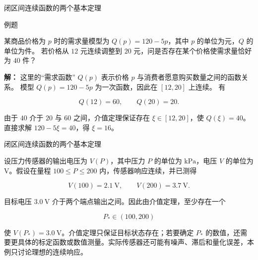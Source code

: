 \documentclass[aspectratio=169,10pt,fontset=fandol]{ctexbeamer}
\begin{document}
\begin{frame}[t,fragile]{闭区间连续函数的两个基本定理}
\normalsize
\begin{block}{例题}
{\normalsize
某商品价格为 $p$ 时的需求量模型为 $Q(p)=120-5p$，其中 $p$ 的单位为元，$Q$ 的单位为件。 若价格从 $12$ 元连续调整到 $20$ 元，问是否存在某个价格使需求量恰好为 $40$ 件？


}
\end{block}
\pause
{\normalsize
\textbf{解：}
这里的“需求函数” $Q(p)$ 表示价格 $p$ 与消费者愿意购买数量之间的函数关系。 模型 $Q(p)=120-5p$ 为一次函数，因此在 $[12,20]$ 上连续。 有

\[

Q(12)=60,\qquad Q(20)=20.

\]

由于 $40$ 介于 $20$ 与 $60$ 之间，介值定理保证存在 $\xi\in[12,20]$，使 $Q(\xi)=40$。 直接求解 $120-5\xi=40$，得 $\xi=16$。


}
\end{frame}
\begin{frame}[t,fragile]{闭区间连续函数的两个基本定理}
\small
{\small
\begin{application}[工程：传感器标定与介值定理]

设压力传感器的输出电压为 $V(P)$，其中压力 $P$ 的单位为 $\mathrm{kPa}$，电压 $V$ 的单位为 $\mathrm V$。假设在量程 $100\leq P\leq200$ 内，传感器响应连续，并已测得

\[

V(100)=2.1\ \mathrm V,\qquad V(200)=3.7\ \mathrm V.

\]

目标电压 $3.0\ \mathrm V$ 介于两个端点输出之间。因此由介值定理，至少存在一个

\[

P_*\in(100,200)

\]

使 $V(P_*)=3.0\ \mathrm V$。介值定理只保证目标状态存在；若要确定 $P_*$ 的数值，还需要更具体的标定函数或数值测量。实际传感器还可能有噪声、滞后和量化误差，本例只讨论理想的连续响应。

\end{application}
}
\end{frame}
\end{document}
